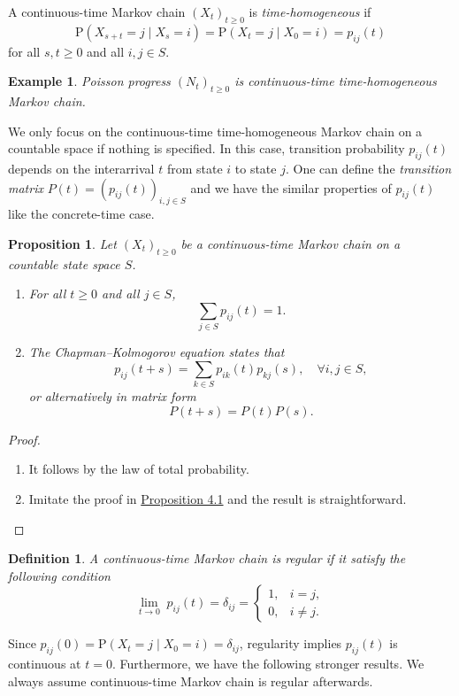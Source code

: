 \documentclass{article}
\newtheorem{definition}{Definition}[section]
\newtheorem{example}{Example}[section]
\newtheorem{proposition}{Proposition}[section]
\theoremstyle{nonumberplain}
\newtheorem{proof}{Proof.}
\begin{document}
\noindent A continuous-time Markov chain $(X_t)_{t\ge0}$ is \emph{time-homogeneous} if
\[
\mathrm{P}(X_{s+t}=j\mid X_{s}=i)=\mathrm{P}(X_{t}=j\mid X_{0}=i)=p_{ij}(t)
\]
for all $s,t\ge0$ and all $i,j\in S$. 
\begin{example}
	Poisson progress $(N_t)_{t\ge0}$ is continuous-time time-homogeneous Markov chain.
\end{example}
We only focus on the continuous-time time-homogeneous Markov chain on a countable space if nothing is specified.
In this case, transition probability $p_{ij}(t)$ depends on the interarrival $t$ from state $i$ to state $j$.
\noindent One can define the \emph{transition matrix}	$P(t)=(p_{ij}(t))_{i,j\in S}$ and we have the similar properties of $p_{ij}(t)$ like the concrete-time case.
\begin{proposition}
	Let $(X_t)_{t\ge0}$ be a continuous-time Markov chain on a countable state space $S$. 
	\begin{enumerate}
		\item For all $t\ge 0$ and all $j\in S$,
		\[
		\sum_{j\in S}p_{ij}(t)=1.
		\]
		\item The \emph{Chapman–Kolmogorov equation} states that
		\[
		p_{ij}(t+s)=\sum_{k\in S}p_{ik}(t)p_{kj}(s),\quad\forall i,j\in S,
		\]
		or alternatively in matrix form
		\[
		P(t+s)=P(t)P(s).
		\]
	\end{enumerate}
\end{proposition}
\begin{proof}\hspace{1em}
	\begin{enumerate}
	\item It follows by the law of total probability.
	\item Imitate the proof in \hyperlink{Proposition 4.1}{Proposition 4.1} and the result is straightforward.
	\end{enumerate} 
\end{proof}
\begin{definition}
A continuous-time Markov chain is \emph{regular} if it satisfy the following condition
\[
\lim_{t\to0}\;p_{ij}(t)=\delta_{ij}=
\begin{cases}
1,&i=j,\\
0,&i\ne j.
\end{cases}
\]
\end{definition}
Since $p_{ij}(0)=\mathrm{P}(X_{t}=j\mid X_{0}=i)=\delta_{ij}$, regularity implies $p_{ij}(t)$ is continuous at $t=0$. Furthermore, we have the following stronger results. We always assume continuous-time Markov chain is regular afterwards.
\end{document}
